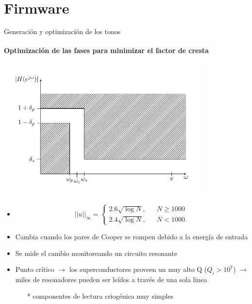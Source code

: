 \documentclass[ignorenonframetext,12pt]{beamer}
\begin{document}
\section{Firmware}
\begin{frame}{Generación y optimización de los tonos}
	\framesubtitle{Optimización de las fases para minimizar el factor de cresta}
	\centering
	\qquad \includegraphics[width=0.8\textwidth]{c4_proto_spec}
	\begin{itemize}
		\item 
			\begin{equation}\label{eq_fc_aleatorios}
  ||u||_\infty = \left\{\begin{array}{rcl}
    2.6 \sqrt{\log{N}}, && N \geq 1000\\
    2.4 \sqrt{\log{N}}, && N < 1000.
  \end{array}\right.
\end{equation}

		\item Cambia cuando los pares de Cooper se rompen debido a la
			energía de entrada
		\item Se mide el cambio monitoreando un circuito resonante
		\item Punto crítico $\to$ los \alert{superconductores proveen un muy
			alto Q} ($Q_i > 10^7$) $\to$ miles de resonadores
			pueden ser leídos a través de una sola linea 
			\begin{itemize}
				\item[*] \scriptsize{{\color{blue}componentes de lectura criogénica muy
					simples}}
			\end{itemize}
	\end{itemize}
\end{frame}
\end{document}
